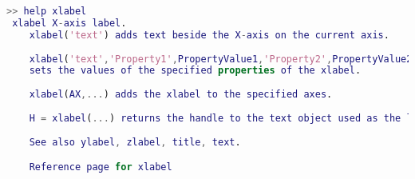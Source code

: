 \begin{lstlisting}[language=matlab]
>> help xlabel
 xlabel X-axis label.
    xlabel('text') adds text beside the X-axis on the current axis.
 
    xlabel('text','Property1',PropertyValue1,'Property2',PropertyValue2,...)
    sets the values of the specified properties of the xlabel.
 
    xlabel(AX,...) adds the xlabel to the specified axes.
 
    H = xlabel(...) returns the handle to the text object used as the label.
 
    See also ylabel, zlabel, title, text.

    Reference page for xlabel

\end{lstlisting}